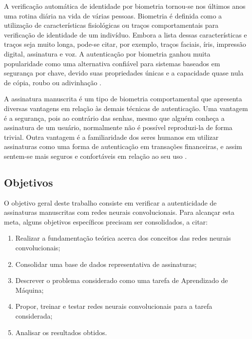 
A verificação automática de identidade por biometria tornou-se nos últimos anos uma rotina diária na vida de várias pessoas. Biometria é definida como a utilização de características fisiológicas ou traços comportamentais para verificação de identidade de um indivíduo. Embora a lista dessas características e traços seja muito longa, pode-se citar, por exemplo, traços faciais, íris, impressão digital, assinatura e voz. A autenticação por biometria ganhou muita popularidade como uma alternativa confiável para sistemas baseados em segurança por chave, devido suas propriedades únicas e a capacidade quase nula de cópia, roubo ou adivinhação \cite{kholmatov}.

A assinatura manuscrita é um tipo de biometria comportamental que apresenta diversas vantagens em relação às demais técnicas de autenticação. Uma vantagem é a segurança, pois ao contrário das senhas, mesmo que alguém conheça a assinatura de um usuário, normalmente não é possível reproduzi-la de forma trivial. Outra vantagem é a familiaridade dos seres humanos em utilizar assinaturas como uma forma de autenticação em transações financeiras, e assim sentem-se mais seguros e confortáveis em relação ao seu uso \cite{heinen}.


\subsection{Objetivos}

O objetivo geral deste trabalho consiste em verificar a autenticidade de assinaturas manuscritas com redes neurais convolucionais. Para alcançar esta meta, alguns objetivos específicos precisam ser consolidados, a citar:

\begin{enumerate}
  \item Realizar a fundamentação teórica acerca dos conceitos das redes neurais convolucionais;
  \item Consolidar uma base de dados representativa de assinaturas;
  \item Descrever o problema considerado como uma tarefa de Aprendizado de Máquina;
  \item Propor, treinar e testar redes neurais convolucionais para a tarefa considerada;
  \item Analisar os resultados obtidos.
\end{enumerate}

